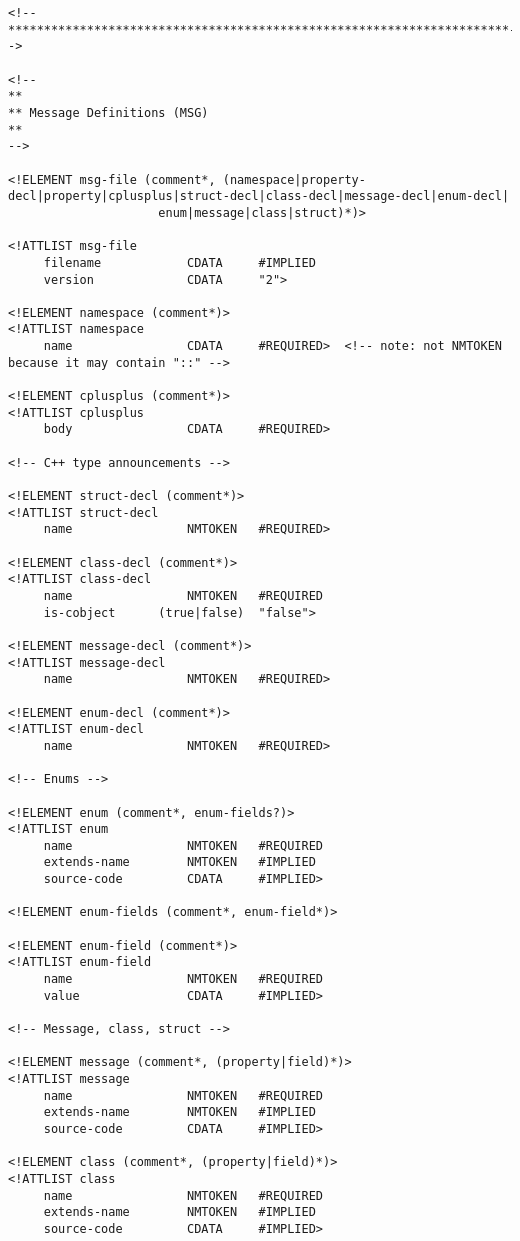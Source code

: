 \begin{verbatim}
<!--**********************************************************************-->

<!--
**
** Message Definitions (MSG)
**
-->

<!ELEMENT msg-file (comment*, (namespace|property-decl|property|cplusplus|struct-decl|class-decl|message-decl|enum-decl|
                     enum|message|class|struct)*)>

<!ATTLIST msg-file
     filename            CDATA     #IMPLIED
     version             CDATA     "2">

<!ELEMENT namespace (comment*)>
<!ATTLIST namespace
     name                CDATA     #REQUIRED>  <!-- note: not NMTOKEN because it may contain "::" -->

<!ELEMENT cplusplus (comment*)>
<!ATTLIST cplusplus
     body                CDATA     #REQUIRED>

<!-- C++ type announcements -->

<!ELEMENT struct-decl (comment*)>
<!ATTLIST struct-decl
     name                NMTOKEN   #REQUIRED>

<!ELEMENT class-decl (comment*)>
<!ATTLIST class-decl
     name                NMTOKEN   #REQUIRED
     is-cobject      (true|false)  "false">

<!ELEMENT message-decl (comment*)>
<!ATTLIST message-decl
     name                NMTOKEN   #REQUIRED>

<!ELEMENT enum-decl (comment*)>
<!ATTLIST enum-decl
     name                NMTOKEN   #REQUIRED>

<!-- Enums -->

<!ELEMENT enum (comment*, enum-fields?)>
<!ATTLIST enum
     name                NMTOKEN   #REQUIRED
     extends-name        NMTOKEN   #IMPLIED
     source-code         CDATA     #IMPLIED>

<!ELEMENT enum-fields (comment*, enum-field*)>

<!ELEMENT enum-field (comment*)>
<!ATTLIST enum-field
     name                NMTOKEN   #REQUIRED
     value               CDATA     #IMPLIED>

<!-- Message, class, struct -->

<!ELEMENT message (comment*, (property|field)*)>
<!ATTLIST message
     name                NMTOKEN   #REQUIRED
     extends-name        NMTOKEN   #IMPLIED
     source-code         CDATA     #IMPLIED>

<!ELEMENT class (comment*, (property|field)*)>
<!ATTLIST class
     name                NMTOKEN   #REQUIRED
     extends-name        NMTOKEN   #IMPLIED
     source-code         CDATA     #IMPLIED>


\end{verbatim}
